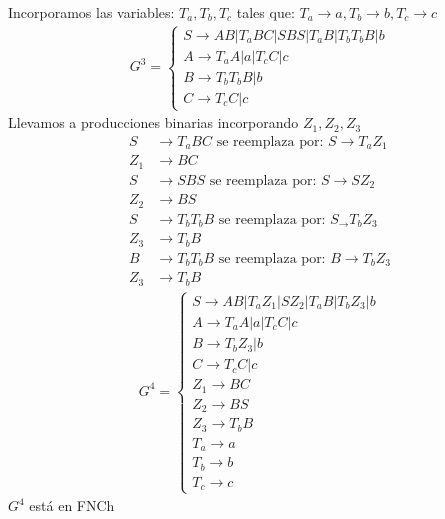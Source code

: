 \begin{itemize}
Incorporamos las variables: $T_a,T_b,T_c$ tales que: $T_a\rightarrow a,T_b\rightarrow b, T_c\rightarrow c$
\begin{align*}
G^3= \left \{ \begin{array}{l}
S\rightarrow AB|T_aBC|SBS|T_aB|T_bT_bB|b	\\
A\rightarrow T_aA|a|T_cC|c	\\
B\rightarrow T_bT_bB|b	\\
C\rightarrow T_cC|c\end{array} \right.
\end{align*}
Llevamos a producciones binarias incorporando $Z_1,Z_2,Z_3$
\begin{align*}
S&\rightarrow T_aBC \mbox{ se reemplaza por: } S\rightarrow T_aZ_1	\\
Z_1&\rightarrow BC\\
S&\rightarrow SBS \mbox{ se reemplaza por: } S\rightarrow SZ_2\\
Z_2&\rightarrow BS	\\
S&\rightarrow T_bT_bB \mbox{  se reemplaza por: } S_\rightarrow T_bZ_3	\\
Z_3&\rightarrow T_bB\\
B&\rightarrow T_bT_bB \mbox{ se reemplaza por: } B\rightarrow T_bZ_3	\\
Z_3&\rightarrow T_bB
\end{align*}
\begin{align*}
G^4=\left \{ \begin{array}{l}
S\rightarrow AB|T_aZ_1|SZ_2|T_aB|T_bZ_3|b	\\
A\rightarrow T_aA|a|T_cC|c	\\
B\rightarrow T_bZ_3|b	\\
C\rightarrow T_cC|c	\\
Z_1\rightarrow BC	\\
Z_2\rightarrow BS	\\
Z_3\rightarrow T_bB \\
T_a\rightarrow a	\\
T_b\rightarrow b	\\
T_c\rightarrow c \end{array} \right.
\end{align*}
$G^4$ está en FNCh
\end{itemize}